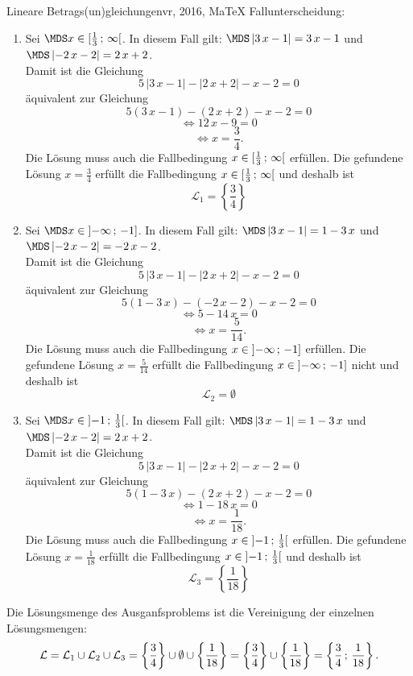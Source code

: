 \begin{MAufgabe}{Lineare Betrags(un)gleichungen}{vr, 2016, MaTeX}
 Fallunterscheidung: 

 \begin{enumerate} 
 \item Sei $ \MDS x\in[ \frac{1}{3} \, \MIntvlSep \, \infty\MoIr $. 
 In diesem Fall gilt: 
  $ \MDS \left| 3\, x - 1\right|=3\, x - 1$ und $ \MDS \left|  - 2\, x - 2\right|=2\, x + 2$. \\ 
 Damit ist die Gleichung 
 $$ 
5\, \left|3\, x - 1\right| - \left|2\, x + 2\right| - x - 2= 0
$$
 \"aquivalent zur Gleichung
 $$ 
5\left(3\, x - 1\right)-\left( 2\, x + 2\right)- x-2= 0 
$$  
$$ 
 \Leftrightarrow 12\, x - 9= 0 
$$  
$$ \Leftrightarrow x = \frac{3}{4} . 
 $$ 
 Die L\"osung muss auch die Fallbedingung $x\in [ \frac{1}{3} \, ; \, \infty[\mbox{}  $ erf\"ullen. Die gefundene L\"osung $x=\frac{3}{4}$ erf\"ullt die Fallbedingung  $x\in [ \frac{1}{3} \, ; \, \infty[\mbox{} $ und deshalb ist  $$
 \mathcal{L}_{1}=\left\{\frac{3}{4}\right\}
 $$ 
\item Sei $ \MDS x\in\MoIl  -\infty \, \MIntvlSep \, -1]$. 
 In diesem Fall gilt: 
  $ \MDS \left| 3\, x - 1\right|=1 - 3\, x$ und $ \MDS \left|  - 2\, x - 2\right|= - 2\, x - 2$. \\ 
 Damit ist die Gleichung 
 $$ 
5\, \left|3\, x - 1\right| - \left|2\, x + 2\right| - x - 2= 0
$$
 \"aquivalent zur Gleichung
 $$ 
5\left(1 - 3\, x\right)-\left(  - 2\, x - 2\right)- x-2= 0 
$$  
$$ 
 \Leftrightarrow 5 - 14\, x= 0 
$$  
$$ \Leftrightarrow x = \frac{5}{14} . 
 $$ 
 Die L\"osung muss auch die Fallbedingung $x\in \mbox{}]\mathopen{}  -\infty \, ; \, -1] $ erf\"ullen. Die gefundene L\"osung $x=\frac{5}{14}$ erf\"ullt die Fallbedingung  $x\in \mbox{}]\mathopen{}  -\infty \, ; \, -1]$ nicht und deshalb ist  $$
 \mathcal{L}_{2}=\emptyset 
 $$ 
\item Sei $ \MDS x\in\MoIl  -1 \, \MIntvlSep \, \frac{1}{3}\MoIr $. 
 In diesem Fall gilt: 
  $ \MDS \left| 3\, x - 1\right|=1 - 3\, x$ und $ \MDS \left|  - 2\, x - 2\right|=2\, x + 2$. \\ 
 Damit ist die Gleichung 
 $$ 
5\, \left|3\, x - 1\right| - \left|2\, x + 2\right| - x - 2= 0
$$
 \"aquivalent zur Gleichung
 $$ 
5\left(1 - 3\, x\right)-\left( 2\, x + 2\right)- x-2= 0 
$$  
$$ 
 \Leftrightarrow 1 - 18\, x= 0 
$$  
$$ \Leftrightarrow x = \frac{1}{18} . 
 $$ 
 Die L\"osung muss auch die Fallbedingung $x\in \mbox{}]\mathopen{}  -1 \, ; \, \frac{1}{3}[\mbox{}  $ erf\"ullen. Die gefundene L\"osung $x=\frac{1}{18}$ erf\"ullt die Fallbedingung  $x\in \mbox{}]\mathopen{}  -1 \, ; \, \frac{1}{3}[\mbox{} $ und deshalb ist  $$
 \mathcal{L}_{3}=\left\{\frac{1}{18}\right\}
 $$ 
 \end{enumerate} 
  Die L\"osungsmenge des Ausganfsproblems ist die Vereinigung der einzelnen L\"osungsmengen: 
$$ \mathcal{L} = \mathcal{L}_{1} \cup \mathcal{L}_{2} \cup \mathcal{L}_{3} 
 = \left\{\frac{3}{4}\right\}\cup \emptyset\cup \left\{\frac{1}{18}\right\} 
  =\left\{\frac{3}{4}\right\}\cup\left\{\frac{1}{18}\right\} 
  = \left\{\frac{3}{4}\, ; \,\frac{1}{18}\right\} 
 . $$ 
 

\end{MAufgabe}
